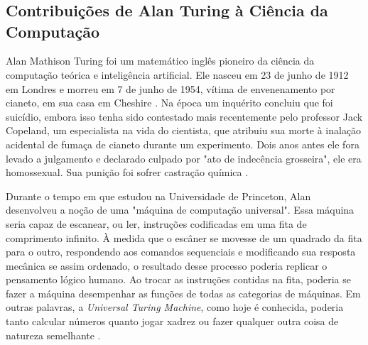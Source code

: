 \documentclass[
  12pt,     %
  openright,      %
  oneside,      %
  a4paper     %
  ]{abntex2}
\begin{document}

\frenchspacing


\imprimircapa

\imprimirfolhaderosto

\tableofcontents*
\cleardoublepage

\textual

\chapter*{}
\section*{Contribuições de Alan Turing à Ciência da Computação}

Alan Mathison Turing foi um matemático inglês pioneiro da ciência da computação teórica e inteligência artificial. Ele nasceu em 23 de junho de 1912 em Londres e morreu em 7 de junho de 1954, vítima de envenenamento por cianeto, em sua casa em Cheshire \cite{Hassall2014}.  Na época um inquérito concluiu que foi suicídio, embora isso tenha sido contestado mais recentemente pelo professor Jack Copeland, um especialista na vida do cientista, que atribuiu sua morte à inalação acidental de fumaça de cianeto durante um experimento. Dois anos antes ele fora levado a julgamento e declarado culpado por "ato de indecência grosseira", ele era homossexual. Sua punição foi sofrer castração química \cite{Library2019}.

Durante o tempo em que estudou na Universidade de Princeton, Alan desenvolveu a noção de uma "máquina de computação universal". Essa máquina seria capaz de escanear, ou ler, instruções codificadas em uma fita de comprimento infinito. À medida que o escâner se movesse de um quadrado da fita para o outro, respondendo aos comandos sequenciais e modificando sua resposta mecânica se assim ordenado, o resultado desse processo poderia replicar o pensamento lógico humano. Ao trocar as instruções contidas na fita, poderia se fazer a máquina desempenhar as funções de todas as categorias de máquinas. Em outras palavras, a \textit{Universal Turing Machine}, como hoje é conhecida, poderia tanto calcular números quanto jogar xadrez ou fazer qualquer outra coisa de natureza semelhante \cite{Gray1999}.
\end{document}
